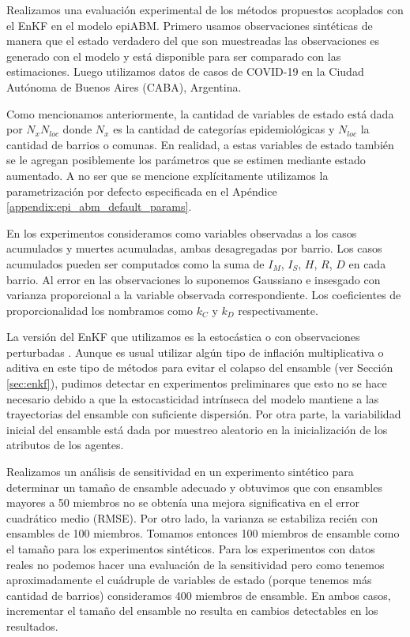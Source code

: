 Realizamos una evaluación experimental de los métodos propuestos acoplados con el EnKF en el modelo epiABM. Primero usamos observaciones sintéticas de manera que el estado verdadero del que son muestreadas las observaciones es generado con el modelo y está disponible para ser comparado con las estimaciones. Luego utilizamos datos de casos de COVID-19 en la Ciudad Autónoma de Buenos Aires (CABA), Argentina. 

Como mencionamos anteriormente, la cantidad de variables de estado está dada por $N_x N_{loc}$ donde $N_x$ es la cantidad de categorías epidemiológicas y $N_{loc}$ la cantidad de barrios o comunas. En realidad, a estas variables de estado también se le agregan posiblemente los parámetros que se estimen mediante estado aumentado. A no ser que se mencione explícitamente utilizamos la parametrización por defecto especificada en el Apéndice \ref{appendix:epi_abm_default_params}.

En los experimentos consideramos como variables observadas a los casos acumulados y muertes acumuladas, ambas desagregadas por barrio. Los casos acumulados pueden ser computados como la suma de $I_M$, $I_S$, $H$, $R$, $D$ en cada barrio. Al error en las observaciones lo suponemos Gaussiano e insesgado con varianza proporcional a la variable observada correspondiente. Los coeficientes de proporcionalidad los nombramos como $k_C$ y $k_D$ respectivamente.

La versión del EnKF que utilizamos es la estocástica o con observaciones perturbadas \citep{Burgers1998}. Aunque es usual utilizar algún tipo de inflación multiplicativa o aditiva en este tipo de métodos para evitar el colapso del ensamble (ver Sección \ref{sec:enkf}), pudimos detectar en experimentos preliminares que esto no se hace necesario debido a que la estocasticidad intrínseca del modelo mantiene a las trayectorias del ensamble con suficiente dispersión. Por otra parte, la variabilidad inicial del ensamble está dada por muestreo aleatorio en la inicialización de los atributos de los agentes.

Realizamos un análisis de sensitividad en un experimento sintético para determinar un tamaño de ensamble adecuado y obtuvimos que con ensambles mayores a 50 miembros no se obtenía una mejora significativa en el error cuadrático medio (RMSE). Por otro lado, la varianza se estabiliza recién con ensambles de 100 miembros. Tomamos entonces 100 miembros de ensamble como el tamaño para los experimentos sintéticos. Para los experimentos con datos reales no podemos hacer una evaluación de la sensitividad pero como tenemos aproximadamente el cuádruple de variables de estado (porque tenemos más cantidad de barrios) consideramos 400 miembros de ensamble. En ambos casos, incrementar el tamaño del ensamble no resulta en cambios detectables en los resultados.

